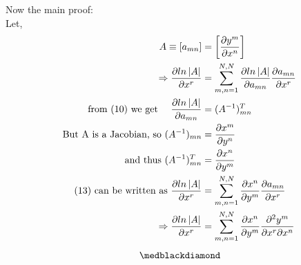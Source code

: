 Now the main proof:\\
Let, 
\begin{align}
\ A \equiv \left[ a_{mn}\right] &= \left[ \pdv{y^m}{x^n}\right]\\
\Rightarrow \pdv{ln\left|A\right|}{x^r} &= \sum_{m,n = 1}^{N,N} \pdv{ln\left|A\right|}{a_{mn}}\pdv{a_{mn}}{x^r}\\
\text{from (10) we get }\quad \pdv{ln\left|A\right|}{a_{mn}} &= (A^{-1})^T_{mn}\\
\text{But A is a Jacobian, so } (A^{-1})_{mn} &= \pdv{x^m}{y^n}\\
\text{ and thus  }(A^{-1})^T_{mn} &=  \pdv{x^n}{y^m}\\
\text{(13) can be written as }  \pdv{ln\left|A\right|}{x^r} &=  \sum_{m,n = 1}^{N,N} \pdv{x^n}{y^m}\pdv{a_{mn}}{x^r}\\
\Rightarrow \pdv{ln\left|A\right|}{x^r} &=  \sum_{m,n = 1}^{N,N} \pdv{x^n}{y^m}\pdv{y^m}{x^r}{x^n}
\end{align}
$$\medblackdiamond$$
\pagebreak[4]
